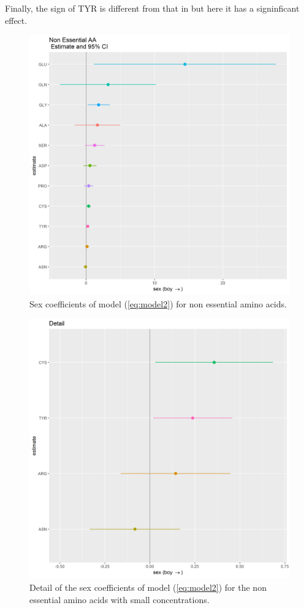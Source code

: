 \documentclass[12pt]{article}
\begin{document}
Finally, the sign of TYR is different from that in \cite{NutrientsDutch} but here it has a signinficant effect.

\begin{figure}[!htb]
  \includegraphics[width= \textwidth]{../sex/NEAA_coeff.png}
  \caption{Sex coefficients of model (\ref{eq:model2}) for non essential amino acids.}
  \label{fig:NEAA_coeff}
\end{figure}

\begin{figure}[!htb]
  \includegraphics[width= \textwidth]{../sex/NEAA_coeff_detail.png}
  \caption{Detail of the sex coefficients of model (\ref{eq:model2}) for the non essential amino acids with small concentrations.}
  \label{fig:NEAA_coeff_detail}
\end{figure}
\end{document}
